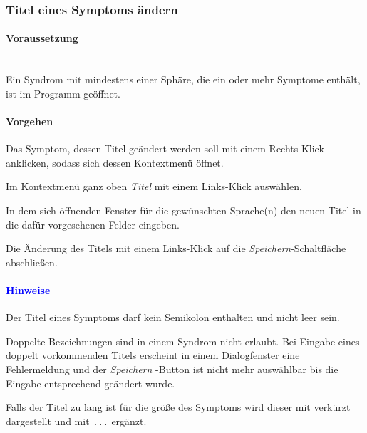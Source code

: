 \documentclass[enabledeprecatedfontcommands,fontsize=11pt,paper=a4,twoside]{scrartcl}
\newcounter{one}
\newcounter{two}[one]
\newcommand*{\hint}{\paragraph{\textcolor{blue}{Hinweise}}}
\newcommand*{\condition}{\paragraph{Voraussetzung}$\;$ \vspace{0.2cm}\\}
\newcommand*{\action}{\paragraph{Vorgehen}}
\let\tempone\itemize
\let\temptwo\enditemize
\renewenvironment{itemize}{\tempone\addtolength{\itemsep}{-10.0pt}}{\temptwo}
\let\origenumerate\enumerate
\let\origendenumerate\endenumerate
\renewenvironment{enumerate}{\origenumerate \addtolength{\itemsep}{-10.0pt}}{\origendenumerate}
\begin{document}
\subsubsection{Titel eines Symptoms ändern}
		\condition 	
		Ein Syndrom mit mindestens einer Sphäre, die ein oder mehr Symptome enthält, ist im Programm geöffnet. 
		\action 
		\begin{enumerate}
			\item Das Symptom, dessen Titel geändert werden soll mit einem Rechts-Klick anklicken, sodass sich dessen Kontextmenü öffnet.
			\item Im Kontextmenü ganz oben \textit{Titel} mit einem Links-Klick auswählen. 
			\item In dem sich öffnenden Fenster für die gewünschten Sprache(n) den neuen Titel in die dafür vorgesehenen Felder eingeben.
			\item Die Änderung des Titels mit einem Links-Klick auf die \textit{Speichern}-Schaltfläche abschließen.
		\end{enumerate}
		\hint
		\begin{itemize}
			\item Der Titel eines Symptoms darf kein Semikolon enthalten und nicht leer sein. 
			\item Doppelte Bezeichnungen sind in einem Syndrom nicht erlaubt. Bei Eingabe eines doppelt vorkommenden Titels erscheint in einem Dialogfenster eine Fehlermeldung und der \textit{Speichern} -Button ist nicht mehr auswählbar bis die Eingabe entsprechend geändert wurde. \item Falls der Titel zu lang ist für die größe des Symptoms wird dieser mit verkürzt dargestellt und mit \texttt{...} ergänzt.\\
		\end{itemize}
			
\end{document}
